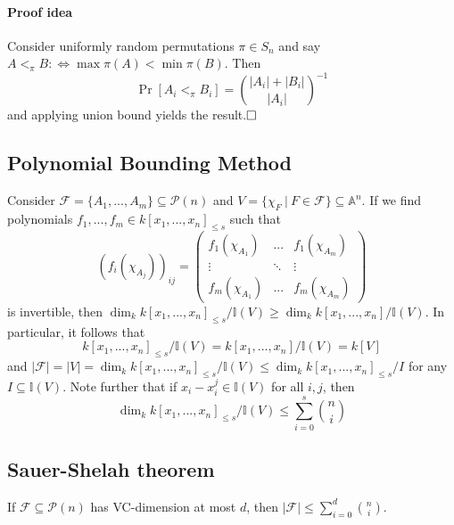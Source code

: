 \documentclass{scrartcl}
\newcommand{\I}{\mathbb{I}}
\begin{document}
\paragraph{Proof idea} Consider uniformly random permutations $\pi \in S_n$ and say $A <_\pi B :\Leftrightarrow \max \pi(A) < \min \pi(B)$.
Then
\begin{equation*}
    \Pr[A_i <_\pi B_i] = {|A_i| + |B_i| \choose |A_i|}^{-1}
\end{equation*}
and applying union bound yields the result.$\hfill\square$

\subsection{Polynomial Bounding Method}
\label{polynomial_bounding_method}
Consider $\mathcal{F} = \{ A_1, ..., A_m \} \subseteq \mathcal{P}(n)$ and $V = \{ \chi_F \ | \ F \in \mathcal{F} \} \subseteq \mathbb{A}^n$.
If we find polynomials $f_1, ..., f_m \in k[x_1, ..., x_n]_{\leq s}$ such that
\begin{equation*}
    (f_i(\chi_{A_j}))_{ij} = \left(\begin{matrix*}
        f_1(\chi_{A_1}) & ... & f_1(\chi_{A_m}) \\
        \vdots & \ddots & \vdots \\
        f_m(\chi_{A_1}) & ... & f_m(\chi_{A_m})
    \end{matrix*}\right)
\end{equation*}
is invertible, then $\dim_k k[x_1, ..., x_n]_{\leq s} / \I(V) \geq \dim_k k[x_1, ..., x_n] / \I(V)$.
In particular, it follows that 
\begin{equation*}
    k[x_1, ..., x_n]_{\leq s} / \I(V) = k[x_1, ..., x_n] / \I(V) = k[V]
\end{equation*}
and $|\mathcal{F}| = |V| = \dim_k k[x_1, ..., x_n]_{\leq s} / \I(V) \leq \dim_k k[x_1, ..., x_n]_{\leq s} / I$ for any $I \subseteq \I(V)$.
Note further that if $x_i - x_i^j \in \I(V)$ for all $i, j$, then
\begin{equation*}
    \dim_k k[x_1, ..., x_n]_{\leq s} / \I(V) \leq \sum_{i = 0}^s {n \choose i}
\end{equation*}

\subsection{Sauer-Shelah theorem}
If $\mathcal{F} \subseteq \mathcal{P}(n)$ has VC-dimension at most $d$, then $|\mathcal{F}| \leq \sum_{i = 0}^d {n \choose i}$.
\end{document}
